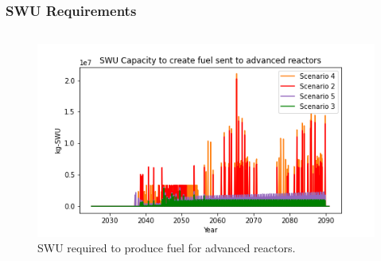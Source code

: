 \begin{frame}
    \frametitle{\gls{SWU} Requirements}
    \begin{columns}
        \column[t]{5cm}

        \column[t]{5cm}
        \begin{figure}
            \centering 
            \includegraphics[scale=0.3]{figures/haleuSWU_scenarios_all.png}
            \caption{\gls{SWU} required to produce fuel for advanced reactors.}
            \label{fig:swu}
        \end{figure}
    \end{columns}
    

\end{frame}

